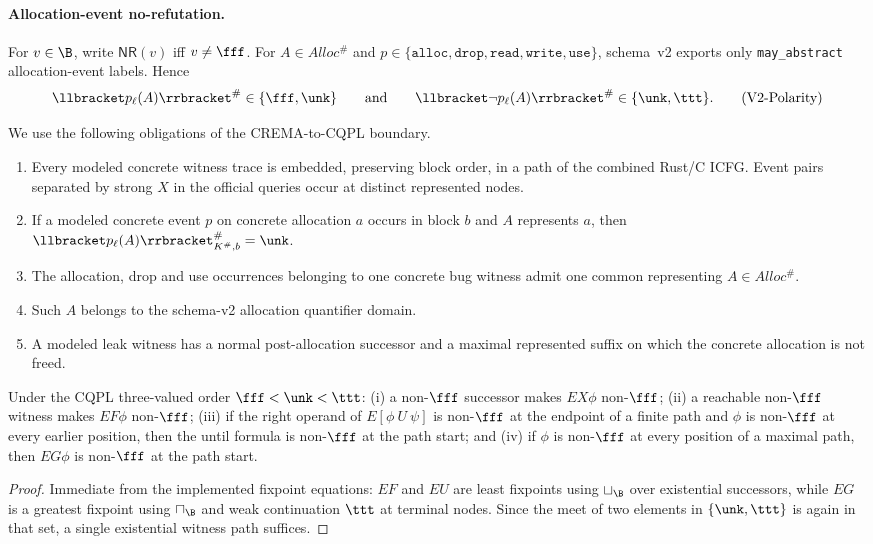 
\paragraph{Allocation-event no-refutation.}
For $v\in\B$, write $\mathsf{NR}(v)$ iff $v\neq\fff$.
For $A\in Alloc^\#$ and $p\in\{\texttt{alloc},\texttt{drop},\texttt{read},
\texttt{write},\texttt{use}\}$, schema~v2 exports only
\texttt{may\_abstract} allocation-event labels. Hence
\[
  \llbracket p_\ell(A)\rrbracket^\#\in\{\fff,\unk\}
  \qquad\text{and}\qquad
  \llbracket \neg p_\ell(A)\rrbracket^\#\in\{\unk,\ttt\}.
\tag{V2-Polarity}
\]

We use the following obligations of the CREMA-to-CQPL boundary.
\begin{enumerate}
\item[\textbf{A1}] Every modeled concrete witness trace is embedded, preserving
block order, in a path of the combined Rust/C ICFG.  Event pairs separated by
strong $X$ in the official queries occur at distinct represented nodes.
\item[\textbf{A2}] If a modeled concrete event $p$ on concrete allocation $a$
occurs in block $b$ and $A$ represents $a$, then
$\llbracket p_\ell(A)\rrbracket^\#_{K^\#,b}=\unk$.
\item[\textbf{A3}] The allocation, drop and use occurrences belonging to one
concrete bug witness admit one common representing $A\in Alloc^\#$.
\item[\textbf{A4}] Such $A$ belongs to the schema-v2 allocation quantifier domain.
\item[\textbf{A5}] A modeled leak witness has a normal post-allocation successor
and a maximal represented suffix on which the concrete allocation is not
freed.
\end{enumerate}

\begin{lemma}
\label{lemma:v2-existential-temporal-nr}
Under the CQPL three-valued order $\fff<\unk<\ttt$:
(i) a non-$\fff$ successor makes $EX\phi$ non-$\fff$;
(ii) a reachable non-$\fff$ witness makes $EF\phi$ non-$\fff$;
(iii) if the right operand of $E[\phi\ U\ \psi]$ is non-$\fff$ at the endpoint
of a finite path and $\phi$ is non-$\fff$ at every earlier position, then the
until formula is non-$\fff$ at the path start; and
(iv) if $\phi$ is non-$\fff$ at every position of a maximal path, then
$EG\phi$ is non-$\fff$ at the path start.
\end{lemma}
\begin{proof}
Immediate from the implemented fixpoint equations: $EF$ and $EU$ are least
fixpoints using $\sqcup_{\B}$ over existential successors, while $EG$ is a
greatest fixpoint using $\sqcap_{\B}$ and weak continuation $\ttt$ at terminal
nodes.  Since the meet of two elements in $\{\unk,\ttt\}$ is again in that set,
a single existential witness path suffices.
\end{proof}

